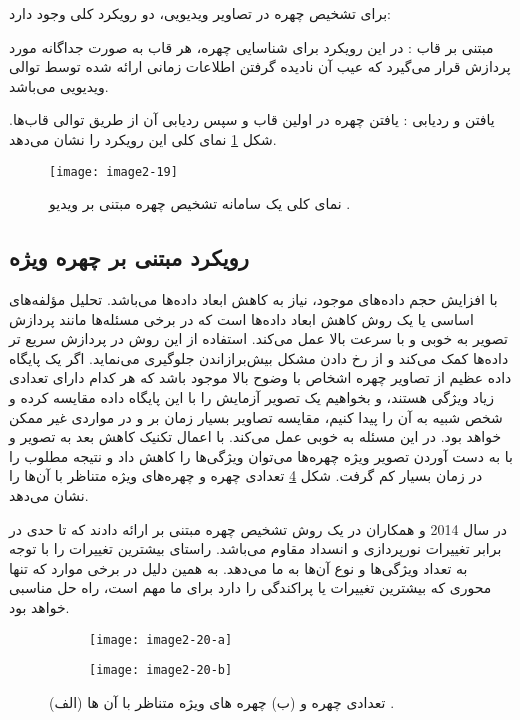 \noindent
برای تشخیص چهره در تصاویر ویدیویی، دو رویکرد کلی وجود دارد:

\noindent
مبتنی بر قاب : در این رویکرد برای شناسایی چهره، هر قاب به صورت جداگانه مورد پردازش قرار می‌گیرد که عیب آن نادیده گرفتن اطلاعات زمانی ارائه شده توسط توالی ویدیویی می‌باشد. 

\noindent
یافتن و ردیابی : یافتن چهره در اولین قاب و سپس ردیابی آن از طریق توالی قاب‌ها. شکل \ref{image2-19} نمای کلی این رویکرد را نشان می‌دهد.
 
 \begin{figure}[h]
\centering
  \texttt{[image: image2-19]}
  \caption{نمای کلی یک سامانه تشخیص چهره مبتنی بر ویدیو \cite{wang2009video}.}
  \label{image2-19}
\end{figure}

 \subsection{رویکرد مبتنی بر چهره ویژه}
با افزایش حجم داده‌های موجود، نیاز به کاهش ابعاد داده‌ها می‌باشد. تحلیل مؤلفه‌های اساسی یا   یک روش‌ کاهش ابعاد داده‌ها است که در برخی مسئله‌ها مانند پردازش تصویر به خوبی و با سرعت بالا عمل می‌کند. استفاده از این روش در پردازش سریع تر داده‌ها کمک می‌کند و از رخ دادن مشکل بیش‌برازاندن  جلوگیری می‌نماید. اگر یک پایگاه داده عظیم از تصاویر چهره اشخاص با وضوح بالا موجود باشد که هر کدام دارای تعدادی زیاد ویژگی هستند، و بخواهیم یک تصویر آزمایش را با این پایگاه داده مقایسه کرده و شخص شبیه به آن را پیدا کنیم، مقایسه تصاویر بسیار زمان بر و در مواردی غیر ممکن خواهد بود.  در این مسئله به خوبی عمل می‌کند. با اعمال تکنیک کاهش بعد به تصویر و با به دست آوردن تصویر ویژه چهره‌ها  می‌توان ویژگی‌ها را کاهش داد و نتیجه مطلوب را در زمان بسیار کم گرفت. شکل \ref{image2-20} تعدادی چهره و چهره‌های ویژه متناظر با آن‌ها را نشان می‌دهد.

\noindent
در سال 2014  و همکاران در \cite{LUAN2014495} یک روش تشخیص چهره مبتنی بر  ارائه دادند که تا حدی در برابر تغییرات نورپردازی و انسداد مقاوم می‌باشد.  راستای بیشترین تغییرات را با توجه به تعداد ویژگی‌ها و نوع آن‌ها به ما می‌دهد. به همین دلیل در برخی موارد که تنها محوری که بیشترین تغییرات یا پراکندگی را دارد برای ما مهم است، راه حل مناسبی خواهد بود. 

\begin{figure}
\begin{subfigure}{.5\textwidth}
  \centering
  \texttt{[image: image2-20-a]}
  \label{image2-20-a}
\end{subfigure}
\begin{subfigure}{.5\textwidth}
  \centering
  \texttt{[image: image2-20-b]}
  \label{image2-20-b}
\end{subfigure}
  \caption{ (الف) تعدادی چهره و (ب) چهره های ویژه متناظر با آن ها \cite{LUAN2014495}.}
\label{image2-20}
\end{figure}

